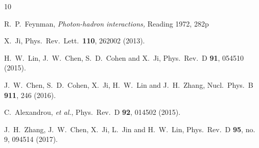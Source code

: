  \begin{thebibliography}{10}
 
  R.~P.~Feynman,
  {\it Photon-hadron interactions,}
  Reading 1972, 282p



  X.~Ji,
  Phys.\ Rev.\ Lett.\  {\bf 110}, 262002 (2013).



  H.~W.~Lin, J.~W.~Chen, S.~D.~Cohen and X.~Ji,
  Phys.\ Rev.\ D {\bf 91}, 054510 (2015).



  J.~W.~Chen, S.~D.~Cohen, X.~Ji, H.~W.~Lin and J.~H.~Zhang,
  Nucl.\ Phys.\ B {\bf 911}, 246 (2016).



  C.~Alexandrou, {\it et al.},
  Phys.\ Rev.\ D {\bf 92}, 014502 (2015).


  
  J.~H.~Zhang, J.~W.~Chen, X.~Ji, L.~Jin and H.~W.~Lin,
  Phys.\ Rev.\ D {\bf 95}, no. 9, 094514 (2017). 


\end{thebibliography}
